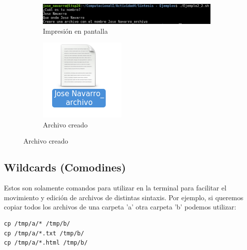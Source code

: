 \documentclass[12pt]{article}
\begin{document}
\begin{figure}[h!]
\begin{subfigure}{.65\textwidth}
  \centering
  \includegraphics[width=.8\linewidth]{Ej2_21.png}
  \caption{Impresión en pantalla}
  \label{fig:sfig1}
\end{subfigure}
\begin{subfigure}{.55\textwidth}
  \centering
  \includegraphics[width=.55\linewidth]{Ej2_22.png}
  \caption{Archivo creado}
  \label{fig:sfig2}
\end{subfigure}
\end{figure}

\subsection{Wildcards (Comodines)}
Estos son solamente comandos para utilizar en la terminal para facilitar el movimiento y edición de archivos de distintas sintaxis. Por ejemplo, si queremos copiar todos los archivos de una carpeta 'a'  otra carpeta 'b' podemos utilizar:

\begin{verbatim}
cp /tmp/a/* /tmp/b/
cp /tmp/a/*.txt /tmp/b/
cp /tmp/a/*.html /tmp/b/
\end{verbatim}
\end{document}
